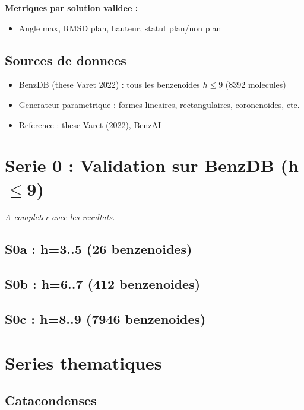 \documentclass[a4paper,11pt]{article}
\begin{document}
\textbf{Metriques par solution validee :}
\begin{itemize}
    \item Angle max, RMSD plan, hauteur, statut plan/non plan
\end{itemize}

\subsection{Sources de donnees}
\begin{itemize}
    \item BenzDB (these Varet 2022) : tous les benzenoides $h \leq 9$ (8392 molecules)
    \item Generateur parametrique : formes lineaires, rectangulaires, coronenoides, etc.
    \item Reference : these Varet (2022), BenzAI
\end{itemize}

\section{Serie 0 : Validation sur BenzDB (h$\leq$9)}

\textit{A completer avec les resultats.}

\subsection{S0a : h=3..5 (26 benzenoides)}

\subsection{S0b : h=6..7 (412 benzenoides)}

\subsection{S0c : h=8..9 (7946 benzenoides)}

\section{Series thematiques}

\subsection{Catacondenses}
\end{document}

